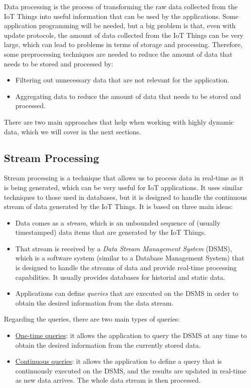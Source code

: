Data processing is the process of transforming the raw data collected from the IoT Things into useful information that can be used by the applications. Some application programming will be needed, but a big problem is that, even with update protocols, the amount of data collected from the IoT Things can be very large, which can lead to problems in terms of storage and processing. Therefore, some preprocessing techniques are needed to reduce the amount of data that needs to be stored and processed by:
\begin{itemize}
    \item Filtering out unnecessary data that are not relevant for the application.
    \item Aggregating data to reduce the amount of data that needs to be stored and processed.
\end{itemize}

There are two main approaches that help when working with highly dynamic data, which we will cover in the next sections.
\subsection{Stream Processing}


Stream processing is a technique that allows us to process data in real-time as it is being generated, which can be very useful for IoT applications. It uses similar techniques to those used in databases, but it is designed to handle the continuous stream of data generated by the IoT Things. It is based on three main ideas:
\begin{itemize}
    \item Data comes as a \emph{stream}, which is an unbounded sequence of (usually timestamped) data items that are generated by the IoT Things.
    \item That stream is received by a \emph{Data Stream Management System} (DSMS), which is a software system (similar to a Database Management System) that is designed to handle the streams of data and provide real-time processing capabilities. It usually provides databases for historial and static data.
    \item Applications can define \emph{queries} that are executed on the DSMS in order to obtain the desired information from the data stream.
\end{itemize}

Regarding the queries, there are two main types of queries:
\begin{itemize}
    \item \ul{One-time queries}: it allows the application to query the DSMS at any time to obtain the desired information from the currently stored data.
    \item \ul{Continuous queries}: it allows the application to define a query that is continuously executed on the DSMS, and the results are updated in real-time as new data arrives. The whole data stream is then processed.
\end{itemize}

